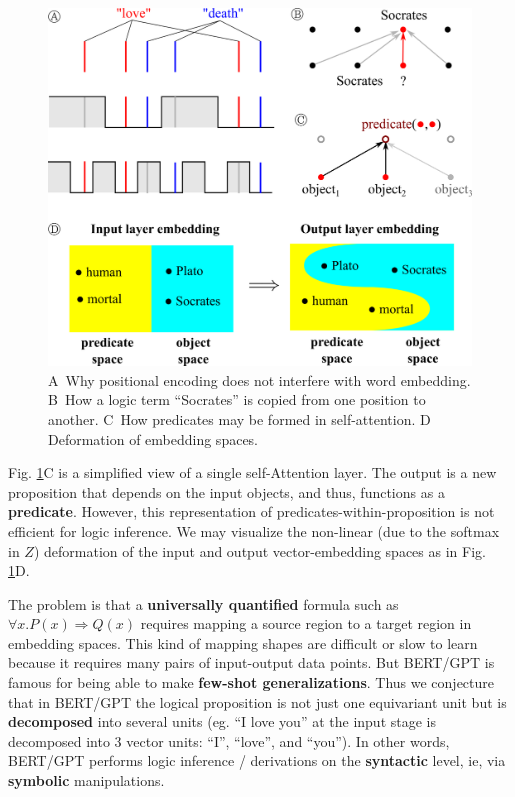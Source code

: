\documentclass[orivec]{llncs}
\newcommand{\circA}{\textcircled{\scriptsize{A}} \,}
\newcommand{\circB}{\textcircled{\scriptsize{B}} \,}
\newcommand{\circC}{\textcircled{\scriptsize{C}} \,}
\newcommand{\circD}{\textcircled{\scriptsize{D}} \,}
\begin{document}
\begin{figure}[h]
\centering
\includegraphics[scale=0.5]{embedding.png}
\caption{\circA Why positional encoding does not interfere with word embedding. \circB How a logic term ``Socrates'' is copied from one position to another. \circC How predicates may be formed in self-attention. \circD Deformation of embedding spaces.}
\label{fig:embedding}
\end{figure}

Fig. \ref{fig:embedding}C is a simplified view of a single self-Attention layer.  The output is a new proposition that depends on the input objects, and thus, functions as a \textbf{predicate}.  However, this representation of predicates-within-proposition is not efficient for logic inference.  We may visualize the non-linear (due to the softmax in $Z$) deformation of the input and output vector-embedding spaces as in Fig. \ref{fig:embedding}D.

The problem is that a \textbf{universally quantified} formula such as $\forall x. P(x) \Rightarrow Q(x)$ requires mapping a source region to a target region in embedding spaces.  This kind of mapping shapes are difficult or slow to learn because it requires many pairs of input-output data points.  But BERT/GPT is famous for being able to make \textbf{few-shot generalizations}.  Thus we conjecture that in BERT/GPT the logical proposition is not just one equivariant unit but is \textbf{decomposed} into several units (eg. ``I love you'' at the input stage is decomposed into 3 vector units: ``I'', ``love'', and ``you'').  In other words, BERT/GPT performs logic inference / derivations on the \textbf{syntactic} level, ie, via \textbf{symbolic} manipulations.
\end{document}
